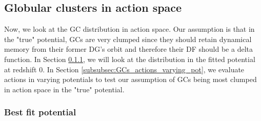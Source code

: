 \subsection{Globular clusters in action space}\label{subsec:GCs_action_space}
Now, we look at the \ac{GC} distribution in action space. Our assumption is that in the "true" potential, \acp{GC} are very clumped since they should retain dynamical memory from their former \ac{DG}'s orbit and therefore their \ac{DF} should be a delta function. In Section \ref{subsubsec:GCs_actions_right_pot}, we will look at the distribution in the fitted potential at redshift 0. In Section \ref{subsubsec:GCs_actions_varying_pot}, we evaluate actions in varying potentials to test our assumption of \acp{GC} being most clumped in action space in the "true" potential. 

\subsubsection{Best fit potential}\label{subsubsec:GCs_actions_right_pot}

